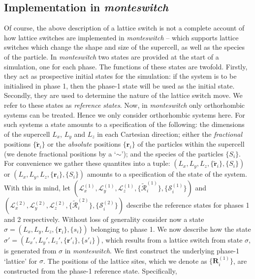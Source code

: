 \documentclass{report}
\begin{document}
\subsection{Implementation in \emph{monteswitch}}
Of course, the above description of a lattice switch is not a complete account of how lattice switches are implemented in \emph{monteswitch} -- which
supports lattice switches which change the shape and size of the supercell, as well as the species of the particle.
%
In \emph{monteswitch} two states are provided at the start of a simulation, one for each phase. The functions of these states are twofold. Firstly, they 
act as prospective initial states for the simulation: if the system is to be initialised in phase 1, then the phase-1 state will be used as the initial state.
Secondly, they are used to determine the nature of the lattice switch move. We refer to these states as \emph{reference states}.
Now, in \emph{monteswitch} only orthorhombic systems can be treated. Hence we only consider orthorhombic systems here. For such systems a state 
amounts to a specification of the following: the dimensions of the supercell $L_x$, $L_y$ and $L_z$ in each Cartesian direction; either the \emph{fractional} 
positions $\lbrace\tilde{\mathbf{r}}_i\rbrace$ or the \emph{absolute} positions $\lbrace\mathbf{r}_i\rbrace$ of the particles within the supercell
(we denote fractional positions by a `$\sim$'); and the species of the particles $\lbrace S_i\rbrace$. For convenience we gather these quantites into
a tuple: $(L_x,L_y,L_z,\lbrace\tilde{\mathbf{r}}_i\rbrace,\lbrace S_i\rbrace)$ or $(L_x,L_y,L_z,\lbrace\mathbf{r}_i\rbrace,\lbrace S_i\rbrace)$ amounts to
a specification of the state of the system. With this in mind, let 
$(\mathcal{L}^{(1)}_x,\mathcal{L}^{(1)}_y,\mathcal{L}^{(1)}_z,\lbrace\tilde{\mathcal{R}}^{(1)}_i\rbrace,\lbrace\mathcal{S}^{(1)}_i\rbrace)$ and
$(\mathcal{L}^{(2)}_x,\mathcal{L}^{(2)}_y,\mathcal{L}^{(2)}_z,\lbrace\tilde{\mathcal{R}}^{(2)}_i\rbrace,\lbrace\mathcal{S}^{(2)}_i\rbrace)$ describe
the reference states for phases 1 and 2 respectively.
Without loss of generality consider now a state $\sigma=(L_x,L_y,L_z,\lbrace\mathbf{r}_i\rbrace,\lbrace s_i\rbrace)$ belonging to phase 1.
We now describe how the state $\sigma'=(L_x',L_y',L_z',\lbrace\mathbf{r}'_i\rbrace,\lbrace s'_i\rbrace)$, which results from a lattice switch from
state $\sigma$, is generated from $\sigma$ in \emph{monteswitch}. We first construct the underlying phase-1 `lattice' for $\sigma$.
The positions of the lattice sites, which we denote as $\lbrace\mathbf{R}^{(1)}_i\rbrace$, are constructed from the phase-1 reference state. Specifically, 
\end{document}
